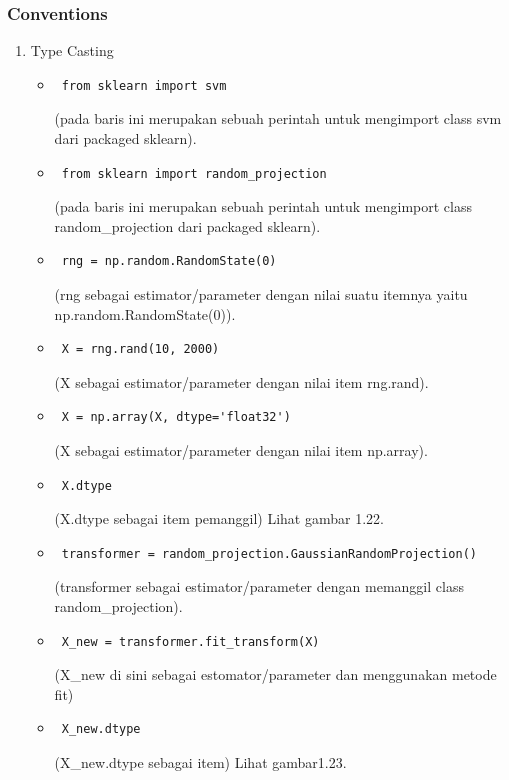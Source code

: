 \subsubsection{Conventions}
\begin{enumerate}
\item Type Casting
\begin{itemize}
\item\begin{verbatim} from sklearn import svm\end{verbatim}(pada baris ini merupakan sebuah perintah untuk mengimport class svm dari packaged sklearn).
\item\begin{verbatim} from sklearn import random_projection\end{verbatim}(pada baris ini merupakan sebuah perintah untuk mengimport class random\_projection dari packaged sklearn).
\item\begin{verbatim} rng = np.random.RandomState(0)\end{verbatim}(rng sebagai estimator/parameter dengan nilai suatu itemnya yaitu np.random.RandomState(0)).
\item\begin{verbatim} X = rng.rand(10, 2000)\end{verbatim}(X sebagai estimator/parameter dengan nilai item rng.rand).
\item\begin{verbatim} X = np.array(X, dtype='float32')\end{verbatim}(X sebagai estimator/parameter dengan nilai item np.array).
\item\begin{verbatim} X.dtype\end{verbatim}(X.dtype sebagai item pemanggil) Lihat gambar 1.22.
\item\begin{verbatim} transformer = random_projection.GaussianRandomProjection()\end{verbatim}(transformer sebagai estimator/parameter dengan memanggil class random\_projection).
\item\begin{verbatim} X_new = transformer.fit_transform(X)\end{verbatim}(X\_new di sini sebagai estomator/parameter dan menggunakan metode fit)
\item\begin{verbatim} X_new.dtype\end{verbatim}(X\_new.dtype sebagai item) Lihat gambar1.23.

\end{itemize}
\end{enumerate}
